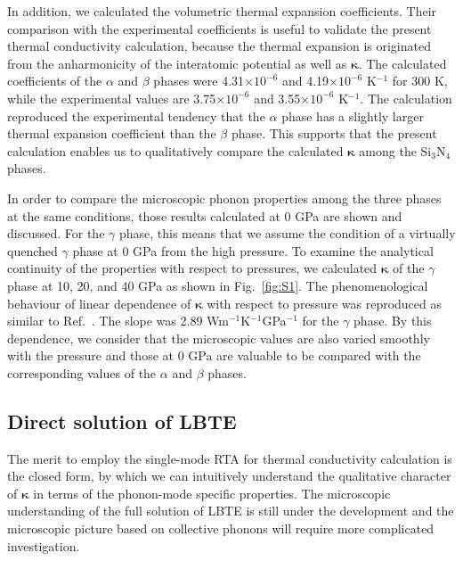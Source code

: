 \documentclass[twocolumn,amsmath,amssymb,a4paper,prb,superscriptaddress,floatfix]{revtex4-1}
\begin{document}
In addition, we calculated the volumetric thermal expansion coefficients. Their
comparison with the experimental coefficients is useful to validate the present
thermal conductivity calculation, because the thermal expansion is originated
from the anharmonicity of the interatomic potential as well as
$\boldsymbol{\kappa}$. The calculated coefficients of the $\alpha$ and $\beta$
phases were 4.31$\times 10^{-6}$ and 4.19$\times 10^{-6}$ K$^{-1}$ for 300 K,
while the experimental values\cite{minikayev-alpha} are 3.75$\times 10^{-6}$
and 3.55$\times 10^{-6}$ K$^{-1}$. The calculation reproduced the
experimental tendency that the $\alpha$ phase has a slightly larger thermal
expansion coefficient than the $\beta$ phase. This supports that the present
calculation enables us to qualitatively compare the calculated
$\boldsymbol{\kappa}$ among the Si$_3$N$_4$ phases.

In order to compare the microscopic phonon properties among the three phases at
the same conditions, those results calculated at 0 GPa are shown and discussed.
For the $\gamma$ phase, this means that we assume the condition of a virtually
quenched $\gamma$ phase at 0 GPa from the high pressure. To examine the
analytical continuity of the properties with respect to pressures, we
calculated $\boldsymbol{\kappa}$ of the $\gamma$ phase at 10, 20, and 40 GPa as
shown in Fig.~\ref{fig:S1}. The phenomenological behaviour of linear dependence
of $\boldsymbol{\kappa}$ with respect to pressure was reproduced as similar to
Ref.~. The slope was 2.89
Wm$^{-1}$K$^{-1}$GPa$^{-1}$ for the $\gamma$ phase.  By this dependence, we
consider that the microscopic values are also varied smoothly with the pressure
and those at 0 GPa are valuable to be compared with the corresponding values of the
$\alpha$ and $\beta$ phases.

\subsection{Direct solution of LBTE}

The merit to employ the single-mode RTA for thermal conductivity calculation is
the closed form, by which we can intuitively understand the qualitative
character of $\boldsymbol{\kappa}$ in terms of the phonon-mode specific
properties.  The microscopic understanding of the full solution of LBTE is still
under the development\cite{cepellotti-relaxons} and the microscopic picture
based on collective phonons\cite{hardy-collective} will require more
complicated investigation.
\end{document}
